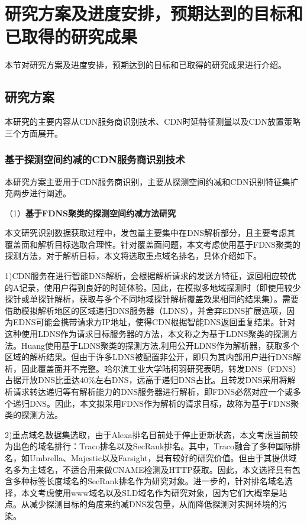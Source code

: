 
\section{研究方案及进度安排，预期达到的目标和已取得的研究成果}
本节对研究方案及进度安排，预期达到的目标和已取得的研究成果进行介绍。
\subsection{研究方案}
本研究的主要内容从CDN服务商识别技术、CDN时延特征测量以及CDN放置策略三个方面展开。

\subsubsection{基于探测空间约减的CDN服务商识别技术}
本研究方案主要用于CDN服务商识别，主要从探测空间约减和CDN识别特征集扩充两步进行阐述。


（1）\textbf{基于FDNS聚类的探测空间约减方法研究}  

本文研究识别数据获取过程中，发包量主要集中在DNS解析部分，且主要考虑其覆盖面和解析目标选取合理性。针对覆盖面问题，本文考虑使用基于FDNS聚类的探测方法，对于解析目标，本文将选取重点域名排名，具体介绍如下。

1)CDN服务在进行智能DNS解析，会根据解析请求的发送方特征，返回相应较优的A记录，使用户得到良好的时延体验。因此，在模拟多地域探测时（即使用较少探针或单探针解析，获取与多个不同地域探针解析覆盖效果相同的结果集）。需要借助模拟解析地区的区域递归DNS服务器（LDNS），并舍弃EDNS扩展选项，因为EDNS可能会携带请求方IP地址，使得CDN根据智能DNS返回重复结果。针对这种使用LDNS作为请求目标服务器的方法，本文称之为基于LDNS聚类的探测方法。Huang\cite{Huang2008}使用基于LDNS聚类的探测方法,利用公开LDNS作为解析器，获取多个区域的解析结果。但由于许多LDNS被配置非公开，即只为其内部用户进行DNS解析，因此覆盖面并不完整\cite{吴金福2014中国大陆}。哈尔滨工业大学陆柯羽研究表明，转发DNS（FDNS）占据开放DNS比重达40\%左右DNS\cite{lukeyu-2021-DNS}，远高于递归DNS占比。且转发DNS采用将解析请求转达递归等有解析能力的DNS服务器进行解析，即FDNS必然对应一个或多个递归DNS。因此，本文拟采用FDNS作为解析的请求目标，故称为基于FDNS聚类的探测方法。
 

2)重点域名数据集选取，由于Alexa排名目前处于停止更新状态，本文考虑当前较为出色的域名排行：Traco\cite{Pochat2018}排名以及SecRank\cite{Xie2022}排名。其中，Traco融合了多种国际排名，如Umbrella、Majestic以及Farsight，具有较好的研究价值。但由于其提供域名多为主域名，不适合用来做CNAME检测及HTTP获取。因此，本文选择具有包含多种标签长度域名的SecRank排名作为研究对象。进一步的，针对排名域名选择，本文考虑使用www域名以及SLD域名作为研究对象，因为它们大概率是站点。从减少探测目标的角度来约减DNS发包量，从而降低探测对实网环境的污染。 



